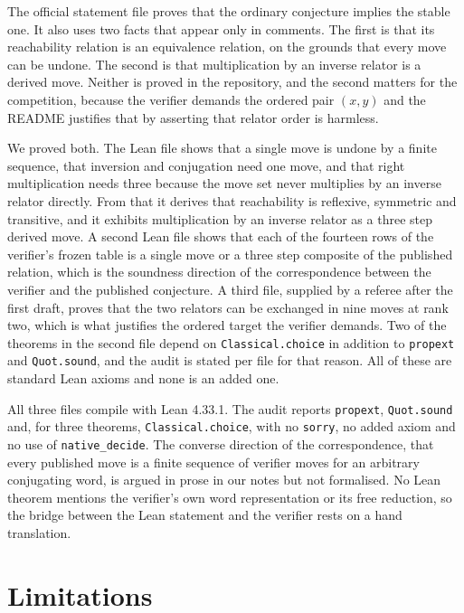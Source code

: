 \documentclass[11pt]{article}
\begin{document}
The official statement file proves that the ordinary conjecture implies the stable one. It also uses two facts that appear only in comments. The first is that its reachability relation is an equivalence relation, on the grounds that every move can be undone. The second is that multiplication by an inverse relator is a derived move. Neither is proved in the repository, and the second matters for the competition, because the verifier demands the ordered pair $(x,y)$ and the README justifies that by asserting that relator order is harmless.

We proved both. The Lean file shows that a single move is undone by a finite sequence, that inversion and conjugation need one move, and that right multiplication needs three because the move set never multiplies by an inverse relator directly. From that it derives that reachability is reflexive, symmetric and transitive, and it exhibits multiplication by an inverse relator as a three step derived move. A second Lean file shows that each of the fourteen rows of the verifier's frozen table is a single move or a three step composite of the published relation, which is the soundness direction of the correspondence between the verifier and the published conjecture. A third file, supplied by a referee after the first draft, proves that the two relators can be exchanged in nine moves at rank two, which is what justifies the ordered target the verifier demands. Two of the theorems in the second file depend on \texttt{Classical.choice} in addition to \texttt{propext} and \texttt{Quot.sound}, and the audit is stated per file for that reason. All of these are standard Lean axioms and none is an added one.

All three files compile with Lean 4.33.1. The audit reports \texttt{propext}, \texttt{Quot.sound} and, for three theorems, \texttt{Classical.choice}, with no \texttt{sorry}, no added axiom and no use of \texttt{native\_decide}. The converse direction of the correspondence, that every published move is a finite sequence of verifier moves for an arbitrary conjugating word, is argued in prose in our notes but not formalised. No Lean theorem mentions the verifier's own word representation or its free reduction, so the bridge between the Lean statement and the verifier rests on a hand translation.

\section{Limitations}
\end{document}
